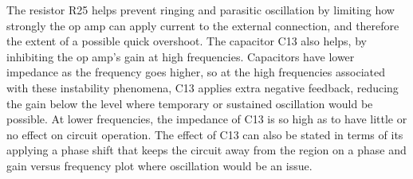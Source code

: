 The resistor R25 helps prevent ringing and parasitic oscillation by limiting
how strongly the op amp can apply current to the external connection, and
therefore the extent of a possible quick overshoot.  The capacitor C13 also
helps, by inhibiting the op amp's gain at high frequencies.  Capacitors have
lower impedance as the frequency goes higher, so at the high frequencies
associated with these instability phenomena, C13 applies extra negative
feedback, reducing the gain below the level where temporary or sustained
oscillation would be possible.  At lower frequencies, the impedance of C13
is so high as to have little or no effect on circuit operation.  The effect
of C13 can also be stated in terms of its applying a phase shift that keeps
the circuit away from the region on a phase and gain versus frequency plot
where oscillation would be an issue.
